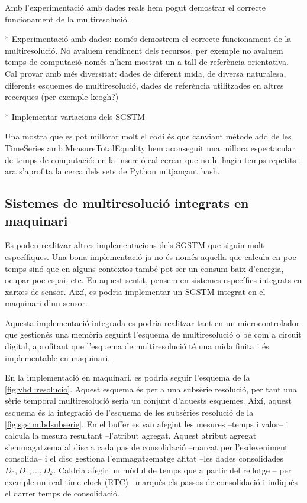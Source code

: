 



Amb l'experimentació amb dades reals hem pogut demostrar el correcte funcionament de la multiresolució. 

* Experimentació amb dades: només demostrem el correcte funcionament de la multiresolució. No avaluem rendiment dels recursos, per exemple no avaluem temps de computació només n'hem mostrat un a tall de referència orientativa.  Cal provar amb més diversitat: dades de diferent mida, de diversa naturalesa, diferents esquemes de multiresolució, dades de referència utilitzades en altres recerques (per exemple keogh?)





* Implementar variacions dels \gls{SGSTM}


  Una mostra que es pot millorar molt
el codi és que canviant mètode add de les TimeSeries amb
MeasureTotalEquality hem aconseguit una millora espectacular de temps
de computació: en la inserció cal cercar que no hi hagin temps
repetits i ara s'aprofita la cerca dels sets de Python mitjançant
hash.









\subsection{Sistemes de multiresolució  integrats en maquinari}

Es poden realitzar altres implementacions dels \gls{SGSTM} que siguin
molt específiques. Una bona implementació ja no és només aquella que
calcula en poc temps sinó que en alguns contextos també pot ser un
consum baix d'energia, ocupar poc espai, etc.  En aquest sentit,
pensem en sistemes específics integrats en xarxes de sensor. Així, es
podria implementar un \gls{SGSTM} integrat en el maquinari d'un sensor.

Aquesta implementació integrada es podria realitzar tant en un
microcontrolador que gestionés una memòria seguint l'esquema de
multiresolució o bé com a circuit digital, aprofitant que l'esquema de
multiresolució té una mida finita i és implementable en maquinari.


En la implementació en maquinari, es podria seguir l'esquema de la
\autoref{fig:vhdl:resolucio}. Aquest esquema és per a una subsèrie
resolució, per tant una sèrie temporal multiresolució seria un conjunt
d'aquests esquemes. Així, aquest esquema és la integració de l'esquema
de les subsèries resolució de la \autoref{fig:sgstm:bdsubserie}.  En
el buffer es van afegint les mesures --temps i valor-- i calcula la
mesura resultant --l'atribut agregat. Aquest atribut agregat
s'emmagatzema al disc a cada pas de consolidació --marcat per
l'esdeveniment consolida-- i el disc gestiona l'emmagatzematge afitat
--les dades consolidades $D_0,D_1,\dotsc,D_k$. Caldria afegir un mòdul
de temps que a partir del rellotge -- per exemple un real-time clock
(RTC)-- marqués els passos de consolidació i indiqués el darrer temps
de consolidació. 






